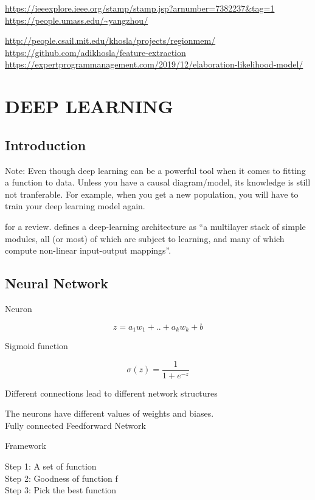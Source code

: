 \documentclass[
]{book}
\begin{document}
\url{https://ieeexplore.ieee.org/stamp/stamp.jsp?arnumber=7382237\&tag=1}
\url{https://people.umass.edu/~yangzhou/}

\url{http://people.csail.mit.edu/khosla/projects/regionmem/}
\url{https://github.com/adikhosla/feature-extraction}
\url{https://expertprogrammanagement.com/2019/12/elaboration-likelihood-model/}

\hypertarget{part-deep-learning}{%
\part{DEEP LEARNING}\label{part-deep-learning}}

\hypertarget{introduction-1}{%
\chapter{Introduction}\label{introduction-1}}

Note: Even though deep learning can be a powerful tool when it comes to fitting a function to data. Unless you have a causal diagram/model, its knowledge is still not tranferable. For example, when you get a new population, you will have to train your deep learning model again.

\citep{LeCun_2015} for a review. \citep{LeCun_2015} defines a deep-learning architecture as ``a multilayer stack of simple modules, all (or most) of which are subject to learning, and many of which compute non-linear input-output mappings''.

\hypertarget{neural-network}{%
\chapter{Neural Network}\label{neural-network}}

Neuron

\[
z = a_1 w_1 + .. + a_k w_k + b
\]

Sigmoid function

\[
\sigma (z) = \frac{1}{1 +e^{-z}}
\]

Different connections lead to different network structures

The neurons have different values of weights and biases.\\
Fully connected Feedforward Network

Framework

Step 1: A set of function\\
Step 2: Goodness of function f\\
Step 3: Pick the best function
\end{document}

